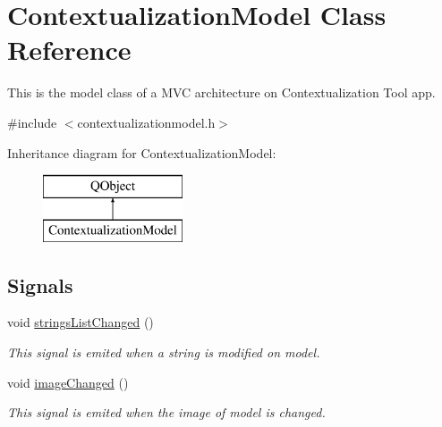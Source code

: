 \hypertarget{classContextualizationModel}{}\section{Contextualization\+Model Class Reference}
\label{classContextualizationModel}


This is the model class of a M\+VC architecture on Contextualization Tool app.  




{\ttfamily \#include $<$contextualizationmodel.\+h$>$}

Inheritance diagram for Contextualization\+Model\+:\begin{figure}[H]
\begin{center}
\leavevmode
\includegraphics[height=2.000000cm]{classContextualizationModel}
\end{center}
\end{figure}
\subsection*{Signals}
\begin{DoxyCompactItemize}
\item 
\mbox{\label{classContextualizationModel_a7b2878843e87cff00f5bce5bcb2d4949}} 
void \mbox{\hyperlink{classContextualizationModel_a7b2878843e87cff00f5bce5bcb2d4949}{strings\+List\+Changed}} ()
\begin{DoxyCompactList}\small\item\em This signal is emited when a string is modified on model. \end{DoxyCompactList}\item 
\mbox{\label{classContextualizationModel_abc9b77f8362faea337fbd18fb25ee93a}} 
void \mbox{\hyperlink{classContextualizationModel_abc9b77f8362faea337fbd18fb25ee93a}{image\+Changed}} ()
\begin{DoxyCompactList}\small\item\em This signal is emited when the image of model is changed. \end{DoxyCompactList}\end{DoxyCompactItemize}
